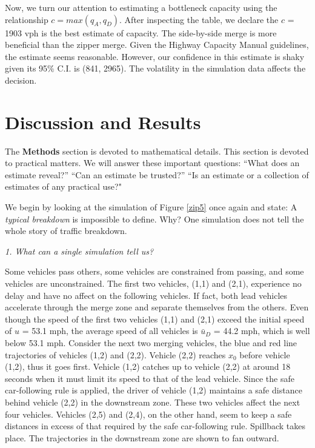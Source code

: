 \documentclass[Proceedings]{ascelike}
\begin{document}
Now, we turn our attention to estimating a bottleneck capacity using the relationship $c = max(q_A,q_D)$. After inspecting the table, we declare the $c$ = 1903 vph is the best estimate of capacity. The side-by-side merge is more beneficial than the zipper merge. Given the Highway Capacity Manual guidelines, the estimate seems reasonable. However, our confidence in this estimate is shaky given its 95$\%$ C.I. is (841, 2965). The volatility in the simulation data affects the decision.


\section{Discussion and Results}

The \textbf{Methods} section is devoted to mathematical details. This section is devoted to practical matters. We will answer these important questions: ``What does an estimate reveal?'' ``Can an estimate be trusted?'' ``Is an estimate or a collection of estimates of any practical use?" 

We begin by looking at the simulation  of Figure \ref{zip5} once again and state: A \emph{typical breakdown} is impossible to define.  Why? One simulation does not tell the whole story of traffic breakdown. 

\noindent \emph{1. What can a single simulation tell us? }

Some vehicles pass others, some vehicles are constrained from passing, and some vehicles are unconstrained.   The first two vehicles, (1,1) and (2,1), experience no delay and have no affect on the following vehicles. If fact, both lead vehicles accelerate through the merge zone and separate themselves from the others. Even though  the speed  of the first two vehicles (1,1) and (2,1) exceed the initial speed of  $u$ = 53.1 mph, the average speed of all vehicles is $\bar{u}_D$ = 44.2 mph, which is well below 53.1 mph.  Consider the next two merging vehicles,  the blue and red line trajectories of  vehicles (1,2) and (2,2). Vehicle (2,2) reaches $x_0$ before vehicle (1,2), thus it goes first. Vehicle (1,2) catches up to vehicle (2,2) at around 18 seconds when it must limit its speed to that of the lead vehicle.  Since the safe car-following rule is applied, the driver of vehicle (1,2)  maintains a safe distance behind vehicle (2,2) in the downstream zone. These two vehicles affect the next four vehicles. Vehicles (2,5) and (2,4), on the other hand, seem to keep a safe distances in excess of that required by the safe car-following rule. Spillback takes place. The trajectories in the downstream zone are shown to fan outward.  
\end{document}
